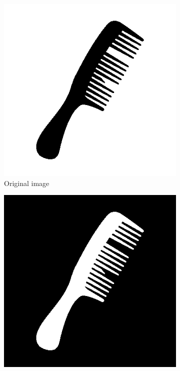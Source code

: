 \documentclass[a4paper]{article}
\begin{document}
\begin{figure}[htp]
\centering
\begin{subfigure}{.33\textwidth}
  \centering
  \includegraphics[width=.9\linewidth]{Image3b}
  \caption{Original image}
\end{subfigure}%
\begin{subfigure}{.33\textwidth}
  \centering
  \includegraphics[width=.9\linewidth]{ex4.1-negated}

\end{subfigure}
\end{figure}
\end{document}
